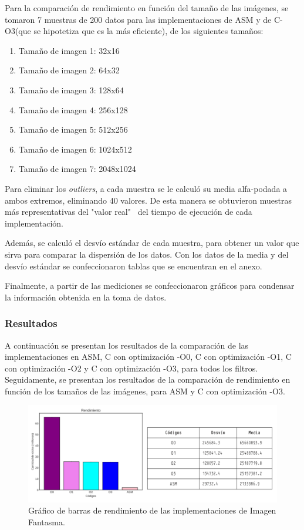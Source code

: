 \documentclass[a4paper]{article}
\begin{document}
\justify
Para la comparación de rendimiento en función del tamaño de las imágenes, se tomaron 7 muestras de 200 datos para las implementaciones de ASM y de C-O3(que se hipotetiza que es la más eficiente), de los siguientes tamaños:
\begin{enumerate}
	\item  Tamaño de imagen 1: 32x16
	\item  Tamaño de imagen 2: 64x32
	\item  Tamaño de imagen 3: 128x64
	\item  Tamaño de imagen 4: 256x128  
	\item  Tamaño de imagen 5: 512x256
	\item  Tamaño de imagen 6: 1024x512
	\item  Tamaño de imagen 7: 2048x1024
\end{enumerate}

\justify	
Para eliminar los \textit{outliers}, a cada muestra se le calculó su media alfa-podada a ambos extremos, eliminando 40 valores. De esta manera se obtuvieron muestras más representativas del "valor real" \ del tiempo de ejecución de cada implementación.

\justify 
Además, se calculó el desvío estándar de cada muestra, para obtener un valor que sirva para comparar la dispersión de los datos. Con los datos de la media y del desvío estándar se confeccionaron tablas que se encuentran en el anexo.

\justify 
Finalmente, a partir de las mediciones se confeccionaron gráficos para condensar la información obtenida en la toma de datos.\\

\justify 
\subsubsection{Resultados}

\justify 
A continuación se presentan los resultados de la comparación de las implementaciones en ASM, C con optimización -O0, C con optimización -O1, C con optimización -O2 y C con optimización -O3, para todos los filtros.
\justify 
Seguidamente, se presentan los resultados de la comparación de rendimiento en función de los tamaños de las imágenes, para ASM y C con optimización -O3.\\ 

\begin{figure}[h!]
	\includegraphics[scale=0.55]{img/ImagenFantasmaConTabla.pdf}
	\caption{Gráfico de barras de rendimiento de las implementaciones de Imagen Fantasma.}
\end{figure}	
\end{document}
